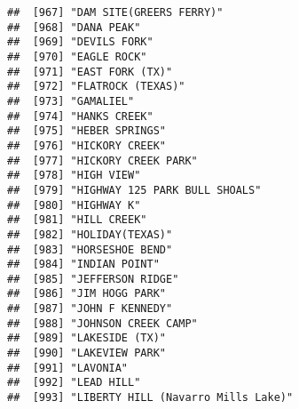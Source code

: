\documentclass[
]{article}
\begin{document}
\begin{verbatim}
##  [967] "DAM SITE(GREERS FERRY)"                                                              
##  [968] "DANA PEAK"                                                                           
##  [969] "DEVILS FORK"                                                                         
##  [970] "EAGLE ROCK"                                                                          
##  [971] "EAST FORK (TX)"                                                                      
##  [972] "FLATROCK (TEXAS)"                                                                    
##  [973] "GAMALIEL"                                                                            
##  [974] "HANKS CREEK"                                                                         
##  [975] "HEBER SPRINGS"                                                                       
##  [976] "HICKORY CREEK"                                                                       
##  [977] "HICKORY CREEK PARK"                                                                  
##  [978] "HIGH VIEW"                                                                           
##  [979] "HIGHWAY 125 PARK BULL SHOALS"                                                        
##  [980] "HIGHWAY K"                                                                           
##  [981] "HILL CREEK"                                                                          
##  [982] "HOLIDAY(TEXAS)"                                                                      
##  [983] "HORSESHOE BEND"                                                                      
##  [984] "INDIAN POINT"                                                                        
##  [985] "JEFFERSON RIDGE"                                                                     
##  [986] "JIM HOGG PARK"                                                                       
##  [987] "JOHN F KENNEDY"                                                                      
##  [988] "JOHNSON CREEK CAMP"                                                                  
##  [989] "LAKESIDE (TX)"                                                                       
##  [990] "LAKEVIEW PARK"                                                                       
##  [991] "LAVONIA"                                                                             
##  [992] "LEAD HILL"                                                                           
##  [993] "LIBERTY HILL (Navarro Mills Lake)"                                                   

\end{verbatim}
\end{document}

